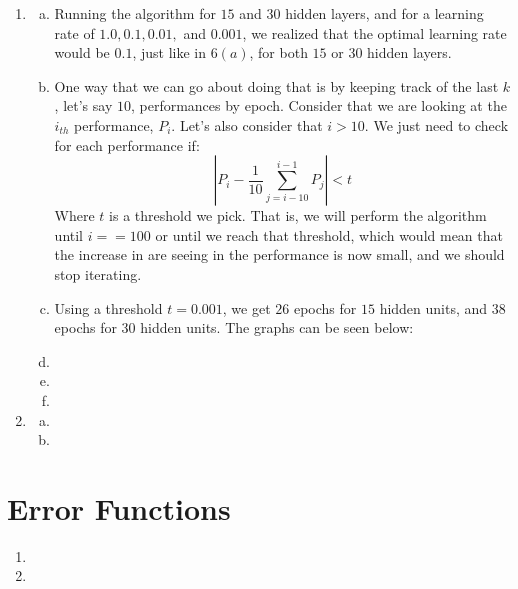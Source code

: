 \documentclass{article}
\begin{document}
\begin{enumerate}
\item

\begin{enumerate}[(a)]

\item %
Running the algorithm for $15$ and $30$ hidden layers, and for a learning rate of $1.0, 0.1, 0.01,$ and $0.001$, we realized that the optimal learning rate would be $0.1$, just like in $6(a)$, for both $15$ or $30$ hidden layers.

\item %
One way that we can go about doing that is by keeping track of the last $k$, let's say $10$, performances by epoch. Consider that we are looking at the $i_{th}$ performance, $P_i$. Let's also consider that $i>10$. We just need to check for each performance if:
$$\left| P_i-\frac{1}{10}\sum_{j=i-10}^{i-1}{P_j}\right|<t$$
Where $t$ is a threshold we pick. That is, we will perform the algorithm until $i==100$ or until we reach that threshold, which would mean that the increase in are seeing in the performance is now small, and we should stop iterating.

\item %
Using a threshold $t=0.001$, we get $26$ epochs for $15$ hidden units, and $38$ epochs for $30$ hidden units. The graphs can be seen below:

\item %

\item %

\item %

\end{enumerate}

\item

\begin{enumerate}[(a)]

\item %

\item %

\end{enumerate}

\end{enumerate}

\section{Error Functions}

\begin{enumerate}

\item %

\item %

\end{enumerate}
\end{document}
